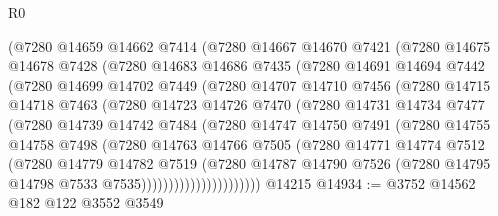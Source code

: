 \begin{lexlean}{R0}
\begin{coremodule}
            (@7280
              @14659
              @14662
              @7414
              (@7280
                @14667
                @14670
                @7421
                (@7280
                  @14675
                  @14678
                  @7428
                  (@7280
                    @14683
                    @14686
                    @7435
                    (@7280
                      @14691
                      @14694
                      @7442
                      (@7280
                        @14699
                        @14702
                        @7449
                        (@7280
                          @14707
                          @14710
                          @7456
                          (@7280
                            @14715
                            @14718
                            @7463
                            (@7280
                              @14723
                              @14726
                              @7470
                              (@7280
                                @14731
                                @14734
                                @7477
                                (@7280
                                  @14739
                                  @14742
                                  @7484
                                  (@7280
                                    @14747
                                    @14750
                                    @7491
                                    (@7280
                                      @14755
                                      @14758
                                      @7498
                                      (@7280
                                        @14763
                                        @14766
                                        @7505
                                        (@7280
                                          @14771
                                          @14774
                                          @7512
                                          (@7280
                                            @14779
                                            @14782
                                            @7519
                                            (@7280
                                              @14787
                                              @14790
                                              @7526
                                              (@7280 @14795 @14798 @7533 @7535))))))))))))))))))))))
    @14215
@14934 := @3752 @14562 @182 @122 @3552 @3549

\end{coremodule}
\end{lexlean}

